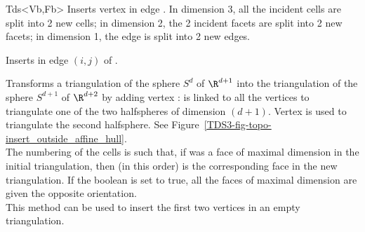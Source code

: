 \begin{ccClassTemplate}{Tds<Vb,Fb>}
{Inserts vertex  in edge . In dimension 3, all the
incident cells are split into 2 new cells; in dimension 2, the 2
incident facets are split into 2 new facets; in dimension 1, the edge is 
split into 2 new edges.
} 

{Inserts  in edge $(i,j)$ of .
}

{Transforms a triangulation of the sphere $S^d$ of $\R^{d+1}$ into the
triangulation of the sphere $S^{d+1}$ of $\R^{d+2}$ by adding vertex :  
 is linked to all the vertices to triangulate one of the two
halfspheres of dimension $(d+1)$. Vertex  is used to
triangulate the second halfsphere. See
Figure~\ref{TDS3-fig-topo-insert_outside_affine_hull}.\\  
The numbering of the cells is such that, if  was a face of
maximal dimension in the initial triangulation, then  (in
this order) is the corresponding face in the new triangulation. If the
boolean  is set to true, all the faces of maximal
dimension are given the opposite orientation.\\
This method can be used to insert the first two vertices in an empty
triangulation.
} 

\begin{ccTexOnly}
\begin{figure}[htbp]


\end{figure}
\end{ccTexOnly}
\end{ccClassTemplate}
